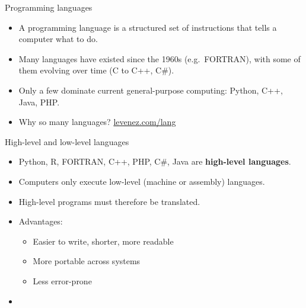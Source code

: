 \documentclass[english,aspectratio=169]{beamer}
\begin{document}
\begin{frame}{Programming languages}
\begin{itemize}
  \item A programming language is a structured set of instructions that tells a computer what to do.
  \item Many languages have existed since the 1960s (e.g.\ FORTRAN), with some of them evolving over time (C to C++, C\#).
  \item Only a few dominate current general-purpose computing: Python, C++, Java, PHP.
  \item Why so many languages?
        \href{http://www.levenez.com/lang/}{levenez.com/lang}
\end{itemize}
\end{frame}

\begin{frame}{High-level and low-level languages}
\begin{itemize}
  \item Python, R, FORTRAN, C++, PHP, C\#, Java are \textbf{high-level languages}.
  \item Computers only execute low-level (machine or assembly) languages.
  \item High-level programs must therefore be translated.
  \item Advantages:
    \begin{itemize}
      \item Easier to write, shorter, more readable
      \item More portable across systems
      \item Less error-prone
    \end{itemize}
  \item  
\end{itemize}
\end{frame}
\end{document}
